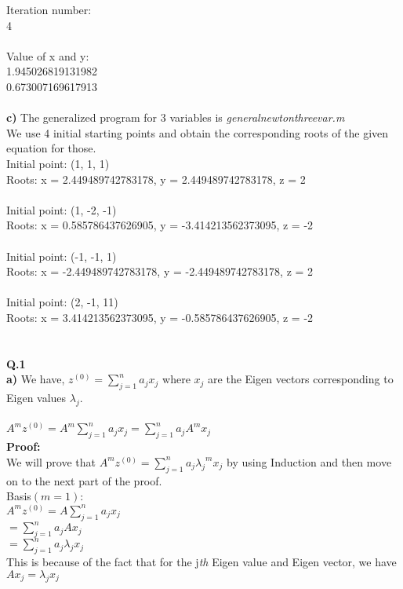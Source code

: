 \documentclass{article}
\begin{document}
Iteration number: \\
     4\\
\\
Value of x and y: \\
   1.945026819131982\\
   0.673007169617913\\
\\
{\bf c)} The generalized program for 3 variables is {\it generalnewtonthreevar.m}\\
We use 4 initial starting points and obtain the corresponding roots of the given equation for those.\\
Initial point: (1, 1, 1)\\
Roots: x = 2.449489742783178, y = 2.449489742783178, z = 2\\
\\
Initial point: (1, -2, -1)\\
Roots: x = 0.585786437626905, y = -3.414213562373095, z = -2\\
\\
Initial point: (-1, -1, 1)\\
Roots: x = -2.449489742783178, y = -2.449489742783178, z = 2\\
\\
Initial point: (2, -1, 11)\\
Roots: x = 3.414213562373095, y = -0.585786437626905, z = -2\\
\\
\\
{\bf Q.1}\\
{\bf a)} We have, $z^{(0)} = \sum_{j=1}^{n}{a_j}{x_j}$  where $x_j$ are the Eigen vectors corresponding to Eigen values ${\lambda}_j$.\\ \\
${A^m}{z^{(0)}} = {A^m}\sum_{j=1}^{n}{a_j}{x_j} = \sum_{j=1}^{n}{a_j}{A^m}{x_j}$\\
{\bf Proof:}\\
We will prove that ${A^m}{z^{(0)}} = \sum_{j=1}^{n}{a_j}{{{\lambda}_j}^m}{x_j}$ by using Induction and then move on to the next part of the proof.\\
Basis$(m = 1)$:\\
${A^m}{z^{(0)}} = {A}\sum_{j=1}^{n}{a_j}{x_j} $\\
$= \sum_{j=1}^{n}{a_j}{A}{x_j}$\\ 
$= \sum_{j=1}^{n}{a_j}{{\lambda}_j}{x_j}$\\
This is because of the fact that for the j{\it th} Eigen value and Eigen vector, we have ${A}{x_j} = {{\lambda}_j}{x_j}$\\
\end{document}
